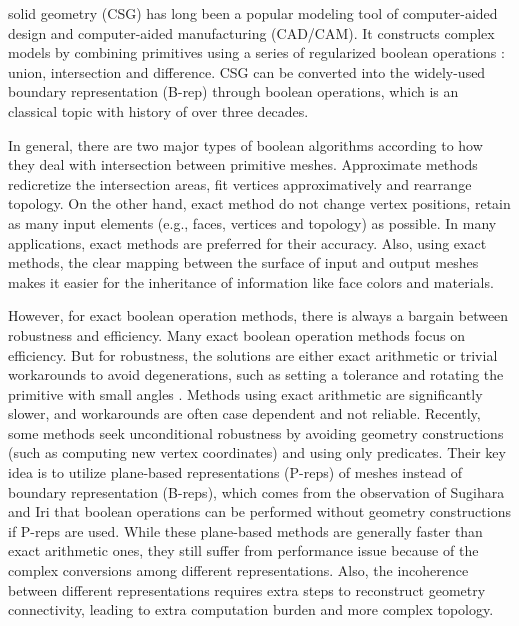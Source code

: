 \documentclass[10pt,journal,compsoc]{IEEEtran}
\begin{document}
\maketitle


\IEEEdisplaynontitleabstractindextext
\IEEEpeerreviewmaketitle

 solid geometry (CSG) has long been a popular modeling tool of computer-aided design and computer-aided manufacturing (CAD/CAM). It constructs complex models by combining primitives using a series of regularized boolean operations \cite{requicha1977mathematical,tilove1980closure}: union, intersection and difference. CSG can be converted into the widely-used boundary representation (B-rep) through boolean operations, which is an classical topic with history of over three decades.

In general, there are two major types of boolean algorithms according to how they deal with intersection between primitive meshes. Approximate methods \cite{wang2011approximate,pavic2010hybrid,biermann2001approximate} redicretize the intersection areas, fit vertices approximatively and rearrange topology. On the other hand, exact method do not change vertex positions, retain as many input elements  (e.g., faces, vertices and topology) as possible. In many applications, exact methods are preferred for their accuracy. Also, using exact methods, the clear mapping between the surface of input and output meshes makes it easier for the inheritance of information like face colors and materials.


However, for exact boolean operation methods, there is always a bargain between robustness and efficiency. Many exact boolean operation methods focus on efficiency. But for robustness, the solutions are either exact arithmetic \cite{barki2015exact,zhou2016mesh} or trivial workarounds to avoid degenerations, such as setting a tolerance \cite{feito2013fast,segal1990using} and rotating the primitive with small angles \cite{douze2015quickcsg}. Methods using exact arithmetic are significantly slower, and workarounds are often case dependent and not reliable. Recently, some methods \cite{bernstein2009fast,campen2010exact} seek unconditional robustness by avoiding geometry constructions (such as computing new vertex coordinates) and using only predicates. Their key idea is to utilize plane-based representations (P-reps) of meshes instead of boundary representation (B-reps), which comes from the observation of Sugihara and Iri \cite{sugihara1990solid} that boolean operations can be performed without geometry constructions if P-reps are used. While these plane-based methods are generally faster than exact arithmetic ones, they still suffer from performance issue because of the complex conversions among different representations. Also, the incoherence between different representations requires extra steps to reconstruct geometry connectivity, leading to extra computation burden and more complex topology.
\end{document}
